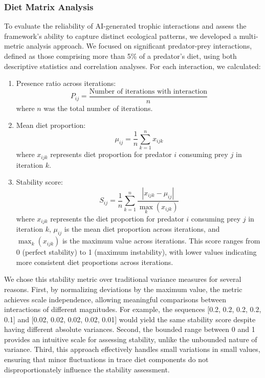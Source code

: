 \subsubsection{Diet Matrix Analysis}
To evaluate the reliability of AI-generated trophic interactions and assess the framework's ability to capture distinct ecological patterns, we developed a multi-metric analysis approach. We focused on significant predator-prey interactions, defined as those comprising more than 5\% of a predator's diet, using both descriptive statistics and correlation analyses. For each interaction, we calculated:

\begin{enumerate}
    \item Presence ratio across iterations:
    \[
    P_{ij} = \frac{\text{Number of iterations with interaction}}{n}
    \]
    where $n$ was the total number of iterations.

    \item Mean diet proportion:
    \[
    \mu_{ij} = \frac{1}{n}\sum_{k=1}^{n} x_{ijk}
    \]
    where $x_{ijk}$ represents diet proportion for predator $i$ consuming prey $j$ in iteration $k$.

    \item Stability score:
    \[
    S_{ij} = \frac{1}{n}\sum_{k=1}^{n} \frac{|x_{ijk} - \mu_{ij}|}{\max_{k}(x_{ijk})}
    \]
    where $x_{ijk}$ represents the diet proportion for predator $i$ consuming prey $j$ in iteration $k$, $\mu_{ij}$ is the mean diet proportion across iterations, and $\max_{k}(x_{ijk})$ is the maximum value across iterations. This score ranges from 0 (perfect stability) to 1 (maximum instability), with lower values indicating more consistent diet proportions across iterations.
\end{enumerate}

We chose this stability metric over traditional variance measures for several reasons. First, by normalizing deviations by the maximum value, the metric achieves scale independence, allowing meaningful comparisons between interactions of different magnitudes. For example, the sequences [0.2, 0.2, 0.2, 0.2, 0.1] and [0.02, 0.02, 0.02, 0.02, 0.01] would yield the same stability score despite having different absolute variances. Second, the bounded range between 0 and 1 provides an intuitive scale for assessing stability, unlike the unbounded nature of variance. Third, this approach effectively handles small variations in small values, ensuring that minor fluctuations in trace diet components do not disproportionately influence the stability assessment.

